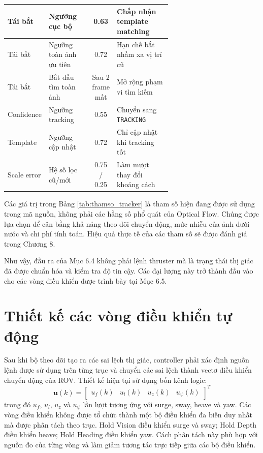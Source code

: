 \documentclass[../DoAn.tex]{subfiles}
\begin{document}
\begin{table}[htbp]
\begin{tabular}{|l|p{0.28\linewidth}|c|p{0.36\linewidth}|}
        Tái bắt & Ngưỡng cục bộ & 0.63 & Chấp nhận template matching \\
        \hline
        Tái bắt & Ngưỡng toàn ảnh ưu tiên & 0.72 & Hạn chế bắt nhầm xa vị trí cũ \\
        \hline
        Tái bắt & Bắt đầu tìm toàn ảnh & Sau 2 frame mất & Mở rộng phạm vi tìm kiếm \\
        \hline
        Confidence & Ngưỡng tracking & 0.55 & Chuyển sang \texttt{TRACKING} \\
        \hline
        Template & Ngưỡng cập nhật & 0.72 & Chỉ cập nhật khi tracking tốt \\
        \hline
        Scale error & Hệ số lọc cũ/mới & 0.75 / 0.25 & Làm mượt thay đổi khoảng cách \\
        \hline
    \end{tabular}
\end{table}

Các giá trị trong Bảng \ref{tab:thamso_tracker} là tham số hiện đang được sử dụng trong mã nguồn, không phải các hằng số phổ quát của Optical Flow. Chúng được lựa chọn để cân bằng khả năng theo dõi chuyển động, mức nhiễu của ảnh dưới nước và chi phí tính toán. Hiệu quả thực tế của các tham số sẽ được đánh giá trong Chương 8.

Như vậy, đầu ra của Mục 6.4 không phải lệnh thruster mà là trạng thái thị giác đã được chuẩn hóa và kiểm tra độ tin cậy. Các đại lượng này trở thành đầu vào cho các vòng điều khiển được trình bày tại Mục 6.5.

\section{Thiết kế các vòng điều khiển tự động}

Sau khi bộ theo dõi tạo ra các sai lệch thị giác, controller phải xác định nguồn lệnh được sử dụng trên từng trục và chuyển các sai lệch thành vectơ điều khiển chuyển động của ROV. Thiết kế hiện tại sử dụng bốn kênh logic:
\[
\mathbf{u}(k) = 
\begin{bmatrix}
u_f(k) & u_l(k) & u_z(k) & u_\psi(k)
\end{bmatrix}^{T}
\]
trong đó $u_f$, $u_l$, $u_z$ và $u_\psi$ lần lượt tương ứng với surge, sway, heave và yaw. Các vòng điều khiển không được tổ chức thành một bộ điều khiển đa biến duy nhất mà được phân tách theo trục. Hold Vision điều khiển surge và sway; Hold Depth điều khiển heave; Hold Heading điều khiển yaw. Cách phân tách này phù hợp với nguồn đo của từng vòng và làm giảm tương tác trực tiếp giữa các bộ điều khiển.
\end{document}
